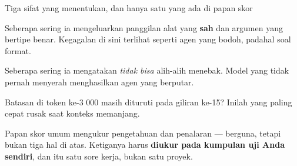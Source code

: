 \documentclass[aspectratio=169,11pt,t]{beamer}
\begin{document}

\begin{frame}[shrink=25]{Tiga sifat yang menentukan, dan hanya satu yang ada di papan skor}
\begin{minipage}[t]{0.3253\textwidth}
\begin{icardaccent}
Seberapa sering ia mengeluarkan panggilan alat yang \textbf{sah} dan argumen yang bertipe benar. Kegagalan di sini terlihat seperti agen yang bodoh, padahal soal format.
\end{icardaccent}
\end{minipage}%
\hfill
\begin{minipage}[t]{0.3253\textwidth}
\begin{icardaccent}
Seberapa sering ia mengatakan \textit{tidak bisa} alih-alih menebak. Model yang tidak pernah menyerah menghasilkan agen yang berputar.
\end{icardaccent}
\end{minipage}%
\hfill
\begin{minipage}[t]{0.3253\textwidth}
\begin{icardaccent}
Batasan di token ke-3 000 masih dituruti pada giliran ke-15? Inilah yang paling cepat rusak saat konteks memanjang.
\end{icardaccent}
\end{minipage}%
{\fontsize{9.4}{12.6}\selectfont\color{fg2}Papan skor umum mengukur pengetahuan dan penalaran --- berguna, tetapi bukan tiga hal di atas. Ketiganya harus \textbf{diukur pada kumpulan uji Anda sendiri}, dan itu satu sore kerja, bukan satu proyek.\par}\vskip 4pt
\end{frame}
\end{document}
